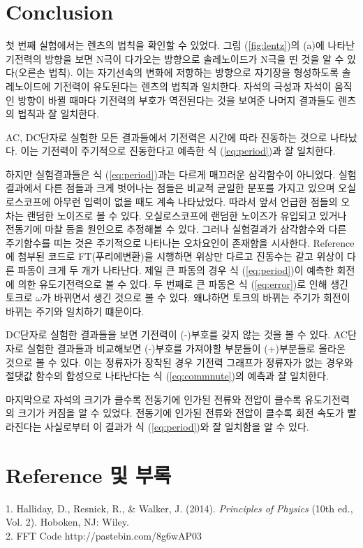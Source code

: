 \documentclass[a4paper]{article}
\begin{document}
	\newpage

	\section{Conclusion}
	첫 번째 실험에서는 렌츠의 법칙을 확인할 수 있었다. 
	그림 (\ref{fig:lentz})의 (a)에 나타난 기전력의 방향을 보면 N극이 다가오는 방향으로 솔레노이드가 N극을 띤 것을 알 수 있다(오른손 법칙). 
	이는 자기선속의 변화에 저항하는 방향으로 자기장을 형성하도록 솔레노이드에 기전력이 유도된다는 렌츠의 법칙과 일치한다. 
	자석의 극성과 자석이 움직인 방향이 바뀔 때마다 기전력의 부호가 역전된다는 것을 보여준 나머지 결과들도 렌츠의 법칙과 잘 일치한다.

	AC, DC단자로 실험한 모든 결과들에서 기전력은 시간에 따라 진동하는 것으로 나타났다. 
	이는 기전력이 주기적으로 진동한다고 예측한 식 (\ref{eq:period})과 잘 일치한다.

	하지만 실험결과들은 식 (\ref{eq:period})과는 다르게 매끄러운 삼각함수이 아니었다.
	실험결과에서 다른 점들과 크게 벗어나는 점들은 비교적 균일한 분포를 가지고 있으며 오실로스코프에 아무런 입력이 없을 때도 계속 나타났었다.
	따라서 앞서 언급한 점들의 오차는 랜덤한 노이즈로 볼 수 있다.
	오실로스코프에 랜덤한 노이즈가 유입되고 있거나 전동기에 마찰 등을 원인으로 추정해볼 수 있다.
	그러나 실험결과가 삼각함수와 다른 주기함수를 띠는 것은 주기적으로 나타나는 오차요인이 존재함을 시사한다.
	Reference에 첨부된 코드로 FT(푸리에변환)을 시행하면 위상만 다르고 진동수는 같고 위상이 다른 파동이 크게 두 개가 나타난다.
	제일 큰 파동의 경우 식 (\ref{eq:period})이 예측한 회전에 의한 유도기전력으로 볼 수 있다.
	두 번째로 큰 파동은 식 (\ref{eq:error})로 인해 생긴 토크로 $\omega$가 바뀌면서 생긴 것으로 볼 수 있다. 왜냐하면 토크의 바뀌는 주기가 회전이 바뀌는 주기와 일치하기 떄문이다.
	
	DC단자로 실험한 결과들을 보면 기전력이 (-)부호를 갖지 않는 것을 볼 수 있다.
	AC단자로 실험한 결과들과 비교해보면 (-)부호를 가져야할 부분들이 (+)부분들로 올라온 것으로 볼 수 있다.
	이는 정류자가 장착된 경우 기전력 그래프가 정류자가 없는 경우와 절댓값 함수의 합성으로 나타난다는 식 (\ref{eq:commnute})의 예측과 잘 일치한다.	

	마지막으로 자석의 크기가 클수록 전동기에 인가된 전류와 전압이 클수록 유도기전력의 크기가 커짐을 알 수 있었다. 전동기에 인가된 전류와 전압이 클수록 회전 속도가 빨라진다는 사실로부터 이 결과가 식 (\ref{eq:period})와 잘 일치함을 알 수 있다.  



\section{Reference 및 부록}
	1. Halliday, D., Resnick, R., \& Walker, J. (2014). {\it{}Principles of Physics} (10th ed., Vol. 2). Hoboken, NJ: Wiley.
	\\ 
	2. FFT Code http://pastebin.com/8g6wAP03
\end{document}
